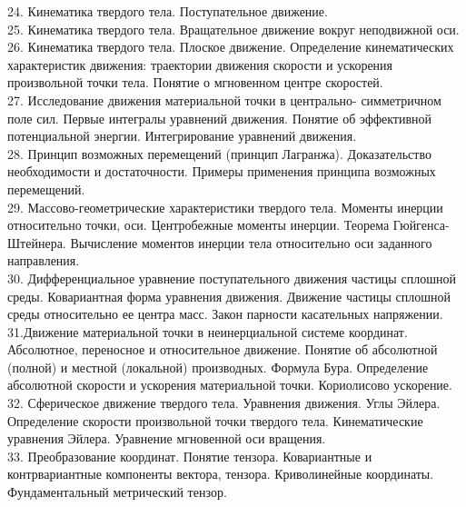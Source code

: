 \documentclass[a4paper, 12pt]{report}
\begin{document}
	24. Кинематика твердого тела. Поступательное движение.\\

	25. Кинематика твердого тела. Вращательное движение
	вокруг неподвижной оси.\\

	26. Кинематика твердого тела. Плоское движение. Определение
	кинематических характеристик движения: траектории движения
	скорости и ускорения произвольной точки тела. Понятие о мгновенном
	центре скоростей.\\

	27. Исследование движения материальной точки в центрально-
	симметричном поле сил. Первые интегралы уравнений движения.
	Понятие об эффективной потенциальной энергии. Интегрирование
	уравнений движения.\\

	28. Принцип возможных перемещений (принцип Лагранжа). 
	Доказательство необходимости и достаточности. Примеры применения
	принципа возможных перемещений.\\

	29. Массово-геометрические характеристики твердого тела. Моменты
	инерции относительно точки, оси. Центробежные моменты инерции.
	Теорема Гюйгенса-Штейнера. Вычисление моментов инерции тела
	относительно оси заданного направления.\\

	30. Дифференциальное уравнение поступательного движения частицы
	сплошной среды. Ковариантная форма уравнения движения. Движение
	частицы сплошной среды относительно ее центра масс. Закон парности
	касательных напряжении.\\

	31.Движение материальной точки в неинерциальной системе координат.
	Абсолютное, переносное и относительное движение. Понятие об
	абсолютной (полной) и местной (локальной) производных. Формула
	Бура. Определение абсолютной скорости и ускорения материальной
	точки. Кориолисово ускорение.\\

	32. Сферическое движение твердого тела. Уравнения движения. Углы
	Эйлера. Определение скорости произвольной точки твердого тела.
	Кинематические уравнения Эйлера. Уравнение мгновенной оси 
	вращения.\\

	33. Преобразование координат. Понятие тензора. Ковариантные и
	контрвариантные компоненты вектора, тензора. Криволинейные
	координаты. Фундаментальный метрический тензор.\\
\end{document}

